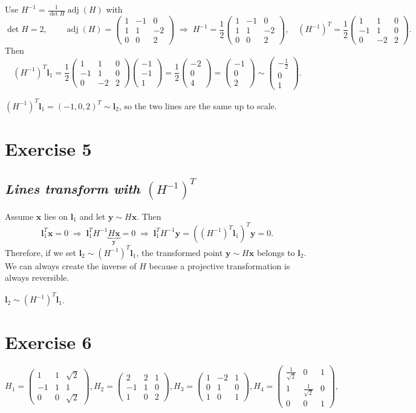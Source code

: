 \documentclass[11pt,a4paper]{article}
\newcommand{\vb}[1]{\mathbf{#1}}
\newcommand{\vect}[1]{
    \begin{pmatrix}#1
\end{pmatrix}}
\newcommand{\exercise}[1]{
\section*{Exercise #1}}
\newcommand{\task}[2]{
\subsection*{#1\quad\normalfont\textit{#2}}}
\begin{document}
Use $H^{-1} = \frac{1}{\det H}\operatorname{adj}(H)$ with
\[
    \det H = 2,\qquad
    \operatorname{adj}(H) = \vect{1&-1&0\\1&1&-2\\0&0&2}
    \;\Longrightarrow\;
    H^{-1} = \frac{1}{2}\vect{1&-1&0\\1&1&-2\\0&0&2},\quad
    (H^{-1})^T = \frac{1}{2}\vect{1&1&0\\-1&1&0\\0&-2&2}.
\]
Then
\[
    (H^{-1})^T\vb{l}_1
    = \frac{1}{2}\vect{1&1&0\\-1&1&0\\0&-2&2}\vect{-1\\-1\\1}
    = \frac{1}{2}\vect{-2\\0\\4}
    = \vect{-1\\0\\2}
    \sim \vect{-\tfrac{1}{2}\\0\\1}.
\]
\begin{answer}
    $(H^{-1})^T\vb{l}_1 = (-1,0,2)^T \sim \vb{l}_2$, so the two lines
    are the same up to scale.
\end{answer}

\exercise{5}

\task{}{Lines transform with $(H^{-1})^T$}

Assume $\vb{x}$ lies on $\vb{l}_1$ and let $\vb{y} \sim H\vb{x}$. Then
\[
    \vb{l}_1^T\vb{x} = 0
    \;\Longrightarrow\;
    \vb{l}_1^T H^{-1}\underbrace{H\vb{x}}_{\vb{y}} = 0
    \;\Longrightarrow\;
    \vb{l}_1^T H^{-1}\vb{y} = \left((H^{-1})^T\vb{l}_1\right)^T\vb{y} = 0.
\]
Therefore, if we set $\vb{l}_2 \sim (H^{-1})^T\vb{l}_1$, the
transformed point $\vb{y} \sim H\vb{x}$ belongs to $\vb{l}_2$.
We can always create the inverse of $H$ because a projective
transformation is always reversible.
\begin{answer}
    $\vb{l}_2 \sim (H^{-1})^T\vb{l}_1$.
\end{answer}

\exercise{6}

$H_1 = \vect{1&1&\sqrt{2}\\-1&1&1\\0&0&\sqrt{2}}, H_2 =
\vect{2&2&1\\-1&1&0\\1&0&2},H_3 = \vect{1&-2&1\\0&1&0\\1&0&1},H_4 =
\vect{\frac{1}{\sqrt{2}}&0&1\\1&\frac{1}{\sqrt{2}}&0\\0&0&1},$
\end{document}

